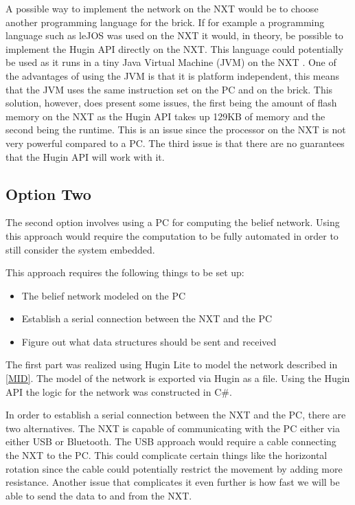 A possible way to implement the network on the NXT would be to choose another
programming language for the brick. If for example a programming language such
as leJOS was used on the NXT it would, in theory, be possible to implement the
Hugin API directly on the NXT. This language could potentially be used as it
runs in a tiny Java Virtual Machine (JVM) on the NXT \cite{LeJos}. One of the
advantages of using the JVM is that it is platform independent, this means that
the JVM uses the same instruction set on the PC and on the brick. This solution,
however, does present some issues, the first being the amount of flash memory on
the NXT as the Hugin API takes up 129KB of memory and the second being the
runtime. This is an issue since the processor on the NXT is not very powerful
compared to a PC.
The third issue is that there are no guarantees that the Hugin API will work
with it.


\subsection{Option Two}
The second option involves using a PC for computing the
belief network. Using this approach would require the computation to be fully
automated in order to still consider the system embedded.\nl

This approach requires the following things to be set up:
\begin{itemize}
\item The belief network modeled on the PC
\item Establish a serial connection between the NXT and the PC
\item Figure out what data structures should be sent and received
\end{itemize}

The first part was realized using Hugin Lite to model the network described
in \autoref{MID}. The model of the network is exported via Hugin as a file.
Using the Hugin API the logic for the network was constructed in C\#.\nl

In order to establish a serial connection between the NXT and the PC, there are
two alternatives. The NXT is capable of communicating with the PC either
via either USB or Bluetooth. The USB approach would require a cable connecting
the NXT to the PC.
This could complicate certain things like the horizontal rotation since the
cable could potentially restrict the movement by adding more resistance.
Another issue that complicates it even further is how fast we will be able to
send the data to and from the NXT.\nl

